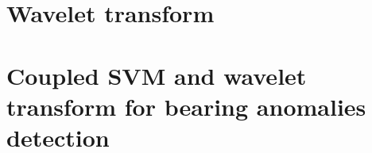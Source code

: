 \documentclass[../Main/thesis.tex]{subfiles}
\begin{document}
\section{Wavelet transform}
\label{sec:wavelet}



\section{Coupled SVM and wavelet transform for bearing anomalies detection}
\label{sec:sectionresult}


















\blankpage
\end{document}

